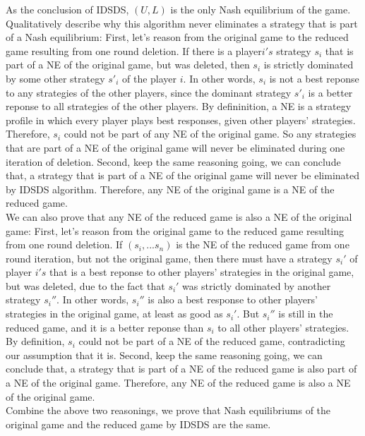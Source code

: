 \documentclass[11pt]{article} %
\begin{document}
As the conclusion of IDSDS, $(U,L)$ is the only Nash equilibrium of the game.\\

Qualitatively describe why this algorithm never eliminates a strategy that is part of a Nash equilibrium: First, let's reason from the original game to the reduced game resulting from one round deletion. If there is a player$i's$ strategy $s_i$ that is part of a NE of the original game, but was deleted, then $s_i$ is strictly dominated by some other strategy $s'_i$ of the player $i$. In other words, $s_i$ is not a best reponse to any strategies of the other players, since the dominant strategy $s'_i$ is a better reponse to all strategies of the other players. By defininition, a NE is a strategy profile in which every player plays best responses, given other players' strategies. Therefore, $s_i$ could not be part of any NE of the original game. So any strategies that are part of a NE of the original game will never be eliminated during one iteration of deletion. Second, keep the same reasoning going, we can conclude that, a strategy that is part of a NE of the original game will never be eliminated by IDSDS algorithm. Therefore, any NE of the original game is a NE of the reduced game. \\

We can also prove that any NE of the reduced game is also a NE of the original game:  First, let's reason from the original game to the reduced game resulting from one round deletion. If $(s_i,...s_n)$ is the NE of the reduced game from one round iteration, but not the original game, then there must have a strategy $s_i'$ of player $i's$ that is a best reponse to other players' strategies in the original game, but was deleted, due to the fact that $s_i'$ was strictly dominated by another strategy $s_i''$. In other words, $s_i''$ is also a best response to other players' strategies in the original game, at least as good as $s_i'$. But $s_i''$ is still in the reduced game, and it is a better reponse than $s_i$ to all other players' strategies. By definition, $s_i$ could not be part of a NE of the reduced game, contradicting our assumption that it is. Second, keep the same reasoning going, we can conclude that, a strategy that is part of a NE of the reduced game is also part of a NE of the original game. Therefore, any NE of the reduced game is also a NE of the original game. \\

Combine the above two reasonings, we prove that Nash equilibriums of the original game and the reduced game by IDSDS are the same. \\
\end{document}
